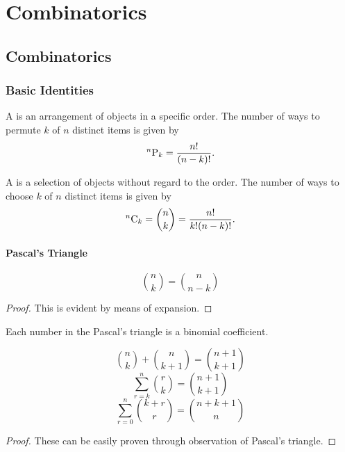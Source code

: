 \part{Combinatorics}
\chapter{Combinatorics}

\section{Basic Identities}
\begin{definition}
A  is an arrangement of objects in a specific order. The number of ways to permute $k$ of $n$ distinct items is given by
\begin{equation}
^{n}\mathrm{P}_{k}=\frac{n!}{(n-k)!}.
\end{equation}
\end{definition}

\begin{definition}
A  is a selection of objects without regard to the order. The number of ways to choose $k$ of $n$ distinct items is given by
\begin{equation}
^{n}\mathrm{C}_{k}=\binom{n}{k}=\frac{n!}{k!(n-k)!}.
\end{equation}
\end{definition}

\subsection{Pascal's Triangle}
\begin{proposition}
\begin{equation}
\binom{n}{k}=\binom{n}{n-k}
\end{equation}
\end{proposition}
\begin{proof}
This is evident by means of expansion.
\end{proof}

Each number in the Pascal's triangle is a binomial coefficient.
\begin{proposition}
\begin{equation} 
\binom{n}{k} + \binom{n}{k+1} = \binom{n+1}{k+1} 
\end{equation}
\begin{equation}
\sum_{r=k}^{n} \binom{r}{k} = \binom{n+1}{k+1}
\end{equation}
\begin{equation}
\sum_{r=0}^{n} \binom{k+r}{r} = \binom{n+k+1}{n}
\end{equation}
\end{proposition}
\begin{proof}
These can be easily proven through observation of Pascal's triangle.
\end{proof}


